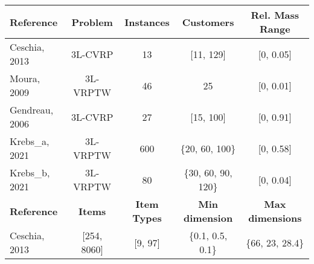 \begin{table}[!ht]
    \centering
    \begin{tabular}{@{}lcccc@{}}
        \toprule
        \textbf{Reference} & \textbf{Problem}                                                                                                                                             & \textbf{Instances}  & \textbf{Customers}     & \textbf{Rel. Mass Range} \\
        \midrule
        Ceschia, 2013      & 3L-CVRP                                                                                                                                                      & 13                  & [11, 129]              & [0, 0.05]                \\
        Moura, 2009        & 3L-VRPTW                                                                                                                                                     & 46                  & 25                     & [0, 0.01]                \\
        Gendreau, 2006     & 3L-CVRP                                                                                                                                                      & 27                  & [15, 100]              & [0, 0.91]                \\
        Krebs\_a, 2021     & 3L-VRPTW                                                                                                                                                     & 600                 & \{20, 60, 100\}        & [0, 0.58]                \\
        Krebs\_b, 2021     & 3L-VRPTW                                                                                                                                                     & 80                  & \{30, 60, 90, 120\}    & [0, 0.04]                \\
        \toprule
        \textbf{Reference} & \textbf{Items}                                                                                                                                               & \textbf{Item Types} & \textbf{Min dimension} & \textbf{Max dimensions}  \\
        \midrule
        Ceschia, 2013      & [254, 8060]                                                                                                                                                  & [9, 97]             & \{0.1, 0.5, 0.1\}      & \{66, 23, 28.4\}         \\

\end{tabular}
\end{table}

